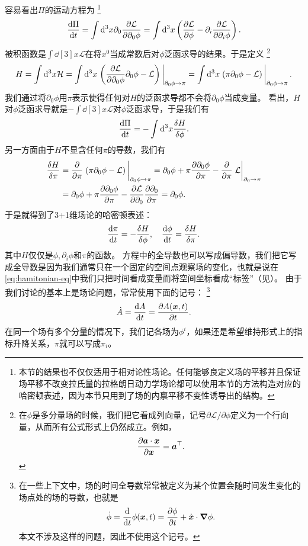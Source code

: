 \documentclass[hyperref, UTF8, a4paper]{ctexart}
\renewcommand{\autoref}{\prettyref}
\begin{document}
容易看出$\Pi$的运动方程为%
\footnote{本节的结果也不仅仅适用于相对论性场论。任何能够良定义场的平移并且保证场平移不改变拉氏量的拉格朗日动力学场论都可以使用本节的方法构造对应的哈密顿表述，因为本节只用到了场的内禀平移不变性诱导出的结构。}
\[
    \dv{\Pi}{t} = \int \dd[3]x \partial_0 \pdv{\mathcal{L}}{\partial_0 \phi} = \int \dd[3]x \left( \pdv{\mathcal{L}}{\phi} - \partial_i \pdv{\mathcal{L}}{\partial_i \phi} \right).
\]
被积函数是$\int \dd[3]x \mathcal{L}$在将$x^0$当成常数后对$\phi$泛函求导的结果。于是定义%
\footnote{在$\phi$是多分量场的时候，我们把它看成列向量，记号$\partial \mathcal{L} / \partial \phi$定义为一个行向量，从而所有公式形式上仍然成立。例如，
\[
    \pdv{\vb*{a} \cdot \vb*{x}}{\vb*{x}} = \vb*{a}^\top.
\]}%
\begin{equation}
    H = \int \dd[3]x \mathcal{H} 
    = \int \dd[3]x \eval{\left( \pdv{\mathcal{L}}{\partial_0 \phi} \partial_0 \phi - \mathcal{L} \right)}_{\partial_0 \phi \to \pi} 
    = \int \dd[3]x \eval{\left( \pi \partial_0 \phi - \mathcal{L} \right)}_{\partial_0 \phi \to \pi}.
    \label{eq:lagrangian-to-hamitonian}
\end{equation}
我们通过将$\partial_0 \phi$用$\pi$表示使得任何对$H$的泛函求导都不会将$\partial_0 \phi$当成变量。
看出，$H$对$\phi$泛函求导就是$-\int \dd[3]x \mathcal{L}$对$\phi$泛函求导，于是我们有
\[
    \dv{\Pi}{t} = - \int \dd[3]x \fdv{H}{\phi}.
\]
另一方面由于$H$不显含任何$\pi$的导数，我们有
\[
    \begin{aligned}
        \fdv{H}{\pi} &= \pdv{\pi} \eval{\left( \pi \partial_0 \phi - \mathcal{L} \right)}_{\partial_0 \phi \to \pi} 
        = \partial_0 \phi + \pi \pdv{\partial_0 \phi}{\pi} - \pdv{\pi} \eval{\mathcal{L}}_{\partial_0 \to \pi} \\
        &= \partial_0 \phi + \pi \pdv{\partial_0 \phi}{\pi} - \pdv{\mathcal{L}}{\partial_0} \pdv{\partial_0}{\pi} = \partial_0 \phi.
    \end{aligned}
\]
于是就得到了3+1维场论的哈密顿表述：
\begin{equation}
    \dv{\pi}{t} = - \fdv{H}{\phi}, \quad \dv{\phi}{t} = \fdv{H}{\pi}.
    \label{eq:hamitonian-eq}
\end{equation}
其中$H$仅仅是$\phi, \partial_i \phi$和$\pi$的函数。
方程中的全导数也可以写成偏导数，我们把它写成全导数是因为我们通常只在一个固定的空间点观察场的变化，也就是说在\eqref{eq:hamitonian-eq}中我们只把时间看成变量而将空间坐标看成“标签”（见\autoref{note:spacial-label}）。
由于我们讨论的基本上是场论问题，常常使用下面的记号：%
\footnote{在一些上下文中，场的时间全导数常常被定义为某个位置会随时间发生变化的场点处的场的导数，也就是
\[
    \dot{\phi} = \dv{t} \phi(\vb*{x}, t) = \pdv{\phi}{t} + \dot{\vb*{x}} \cdot \grad{\phi}.
\]
本文不涉及这样的问题，因此不使用这个记号。
}%
\[
    \dot{A} = \dv{A}{t} = \pdv{A(\vb*{x}, t)}{t}.
\]
在同一个场有多个分量的情况下，我们记各场为$\phi^i$，如果还是希望维持形式上的指标升降关系，$\pi$就可以写成$\pi_i$。
\end{document}
